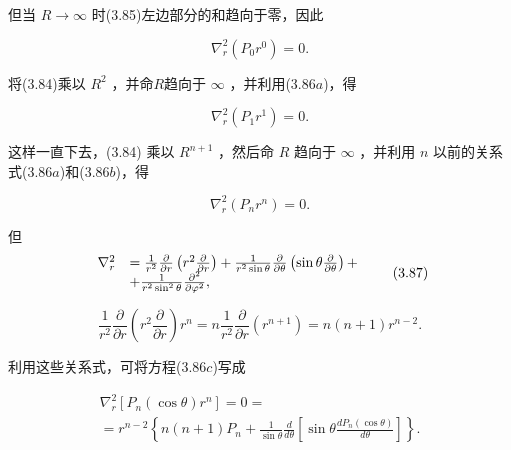 但当 $R \to \infty$ 时(3.85)左边部分的和趋向于零，因此

\begin{equation*}
\nabla_ {r} ^ {2} \left(P _ {0} r ^ {0}\right) = 0.\tag{3.86a}
\end{equation*}

将(3.84)乘以 $R^{2}$ ，并命$R$趋向于 $\infty$ ，并利用(3.86$a$)，得

\begin{equation*}
\nabla_ {r} ^ {2} \left(P _ {1} r ^ {1}\right) = 0.\tag{3.86b}
\end{equation*}

这样一直下去，(3.84) 乘以 $R^{n+1}$ ，然后命 $R$ 趋向于 $\infty$ ，并利用 $n$ 以前的关系式(3.86$a$)和(3.86$b$)，得

\begin{equation*}
\nabla_ {r} ^ {2} \left(P _ {n} r ^ {n}\right) = 0.\tag{3.86c}
\end{equation*}

但
\begin{equation*}
\begin{array}{r l} \nabla_ {r} ^ {2} & = \frac {1}{r ^ {2}} \frac {\partial}{\partial r} \left(r ^ {2} \frac {\partial}{\partial r}\right) + \frac {1}{r ^ {2} \sin \theta} \frac {\partial}{\partial \theta} \left(\sin \theta \frac {\partial}{\partial \theta}\right) + \\ & + \frac {1}{r ^ {2} \sin^ {2} \theta} \frac {\partial^ {2}}{\partial \varphi^ {2}}, \end{array}\tag{3.87}
\end{equation*}

\begin{equation*}
\frac {1}{r ^ {2}} \frac {\partial}{\partial r} \left(r ^ {2} \frac {\partial}{\partial r}\right) r ^ {n} = n \frac {1}{r ^ {2}} \frac {\partial}{\partial r} (r ^ {n + 1}) = n (n + 1) r ^ {n - 2}.
\end{equation*}

利用这些关系式，可将方程(3.86$c$)写成

\begin{equation*}
\begin{array}{l} \nabla_ {r} ^ {2} [ P _ {n} (\cos \theta) r ^ {n} ] = 0 = \\ = r ^ {n - 2} \left\{n (n + 1) P _ {n} + \frac {1}{\sin \theta} \frac {d}{d \theta} \left[ \sin \theta \frac {d P _ {n} (\cos \theta)}{d \theta} \right] \right\}. \end{array}\tag{3.88}
\end{equation*}

